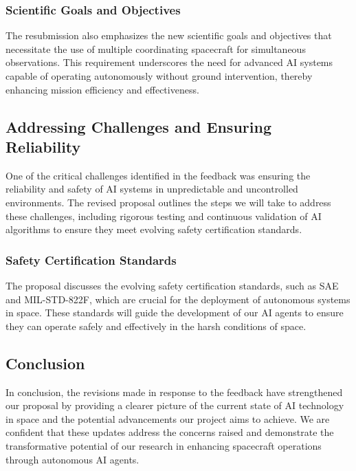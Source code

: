 \documentclass[a4paper,12pt]{article}
\begin{document}
\subsubsection{Scientific Goals and Objectives}

The resubmission also emphasizes the new scientific goals and objectives that necessitate the use of multiple coordinating spacecraft for simultaneous observations. This requirement underscores the need for advanced AI systems capable of operating autonomously without ground intervention, thereby enhancing mission efficiency and effectiveness.

\subsection{Addressing Challenges and Ensuring Reliability}

One of the critical challenges identified in the feedback was ensuring the reliability and safety of AI systems in unpredictable and uncontrolled environments. The revised proposal outlines the steps we will take to address these challenges, including rigorous testing and continuous validation of AI algorithms to ensure they meet evolving safety certification standards.

\subsubsection{Safety Certification Standards}

The proposal discusses the evolving safety certification standards, such as SAE and MIL-STD-822F, which are crucial for the deployment of autonomous systems in space. These standards will guide the development of our AI agents to ensure they can operate safely and effectively in the harsh conditions of space.

\subsection{Conclusion}

In conclusion, the revisions made in response to the feedback have strengthened our proposal by providing a clearer picture of the current state of AI technology in space and the potential advancements our project aims to achieve. We are confident that these updates address the concerns raised and demonstrate the transformative potential of our research in enhancing spacecraft operations through autonomous AI agents.
\end{document}
